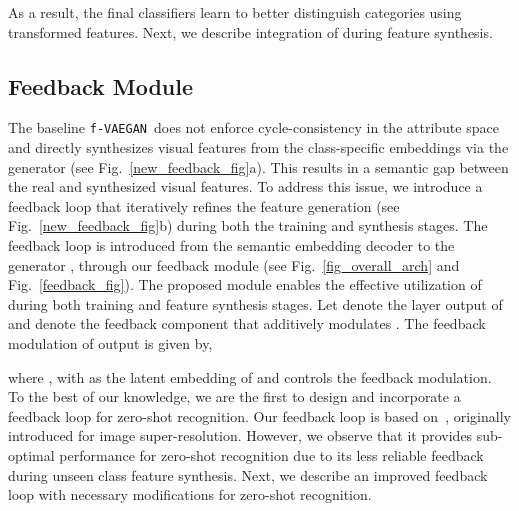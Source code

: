 \documentclass[runningheads]{llncs}
\newcommand{\vaegan}{\texttt{f-VAEGAN}}
\begin{document}
As a result, the final classifiers learn to better distinguish categories using transformed features.
Next, we describe integration of  during feature synthesis. 



\subsection{Feedback Module\label{sec_feedback}}
The baseline \vaegan~does not enforce cycle-consistency in the attribute space and directly synthesizes visual features  from the class-specific embeddings  via the generator (see Fig.~\ref{new_feedback_fig}a). This results in a semantic gap between the real and synthesized visual features. To address this issue, we introduce a feedback loop that iteratively refines the feature generation (see Fig.~\ref{new_feedback_fig}b) during both the training and synthesis stages. The feedback loop is introduced from the semantic embedding decoder  to the generator , through our feedback module  (see Fig.~\ref{fig_overall_arch} and Fig.~\ref{feedback_fig}). The proposed module  enables the effective utilization of  during both training and feature synthesis stages. Let  denote the  layer output of  and  denote the feedback component that additively modulates . The feedback modulation of output  is given by,

where , with  as the latent embedding of  and  controls the feedback modulation. To the best of our knowledge, we are the first to design and incorporate a feedback loop for zero-shot recognition. Our feedback loop is based on~\cite{shama19iccv}, originally introduced for image super-resolution. However, we observe that it provides sub-optimal performance for zero-shot recognition due to its less reliable feedback during unseen class feature synthesis. Next, we describe an improved feedback loop with necessary modifications for zero-shot recognition. 
\end{document}
